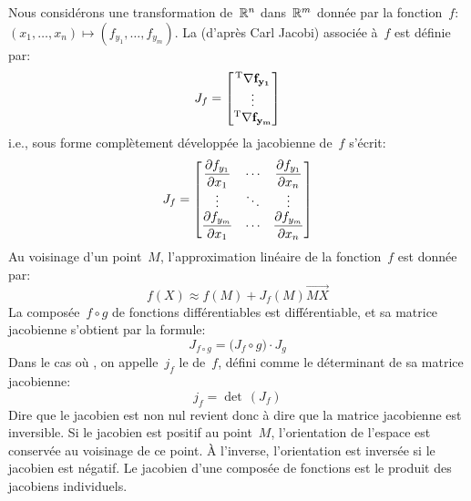 Nous considérons une transformation de~$\mathbb R^n$ dans~$\mathbb R^m$ donnée par la fonction~$f$: 
$\left(x_1, \ldots, x_n \right) \mapsto \left(f_{y_1}, \ldots, f_{y_m} \right)$.
\medskipvm
La  (d'après Carl Jacobi) associée à~$f$ est définie par:
\begin{equation}
J_f = \MM*{\LL{\nabla f_{y_1}} \\ \vdots \\ \LL{\nabla f_{y_m}}}
\end{equation}
i.e., sous forme complètement développée la jacobienne de~$f$ s'écrit:
\begin{equation}
J_f = \MM*{\dfrac{\partial f_{y_1}}{\partial x_1} & \cdots & \dfrac{\partial f_{y_1}}{\partial x_n} \\ \vdots & \ddots & \vdots \\ \dfrac{\partial f_{y_m}}{\partial x_1} & \cdots & \dfrac{\partial f_{y_m}}{\partial x_n}}
\end{equation}
\medskipvm
Au voisinage d'un point~$M$, l'approximation linéaire de la fonction~$f$ est donnée par:
\begin{equation} f\left(X\right) \approx f\left(M\right) + J_f\left(M\right) \overrightarrow{MX}\end{equation}
\medskipvm
La composée~$f\circ g$ de fonctions différentiables est différentiable, et sa matrice jacobienne s'obtient par la formule:
\begin{equation} J_{f \circ g}= \bigl( J_f \circ g \bigr) \cdot J_g\end{equation}
\medskipvm
Dans le cas où , on appelle~$j_f$ le  de~$f$, 
défini comme le déterminant de sa matrice jacobienne: 
\begin{equation} j_f = \det\, \left(J_f \right) \end{equation}
Dire que le jacobien est non nul revient donc à dire que la matrice jacobienne est inversible.
\medskipvm
Si le jacobien est positif au point~$M$, l'orientation de l'espace est conservée au voisinage de ce point. À l'inverse, l'orientation est inversée si le jacobien est négatif.
\medskipvm
Le jacobien d'une composée de fonctions est le produit des jacobiens individuels.
